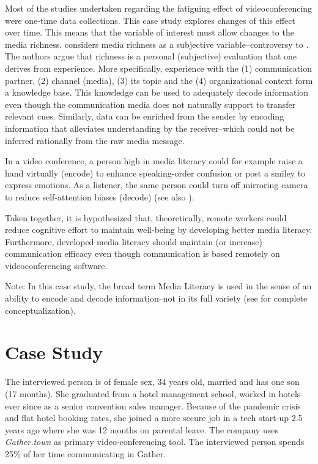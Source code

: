 \documentclass[man]{apa7}
\begin{document}
Most of the studies undertaken regarding the fatiguing effect of videoconferencing were one-time data collections. This case study explores changes of this effect over time. This means that the variable of interest must allow changes to the media richness. \cite{Carlson1999} considers media richness as a subjective variable–controversy to \citeauthor{daft1983information}. The authors argue that richness is a personal (subjective) evaluation that one derives from experience. More specifically, experience with the (1) communication partner, (2) channel (media), (3) its topic and the (4) organizational context form a knowledge base. This knowledge can be used to adequately decode information even though the communication media does not naturally support to transfer relevant cues. Similarly, data can be enriched from the sender by encoding information that alleviates understanding by the receiver–which could not be inferred rationally from the raw media message.

In a video conference, a person high in media literacy could for example raise a hand virtually (encode) to enhance speaking-order confusion or post a smiley to express emotions. As a listener, the same person could turn off mirroring camera to reduce self-attention biases (decode) (see also \cite{Riedl2021}).

Taken together, it is hypothesized that, theoretically, remote workers could reduce cognitive effort to maintain well-being by developing better media literacy. Furthermore, developed media literacy should maintain (or increase) communication efficacy even though communication is based remotely on videoconferencing software.

Note: In this case study, the broad term Media Literacy is used in the sense of an ability to encode and decode information–not in its full variety (see \cite{Potter2010} for complete conceptualization).


\section{Case Study}

The interviewed person is of female sex, 34 years old, married and has one son (17 months). She graduated from a hotel management school, worked in hotels ever since as a senior convention sales manager. Because of the pandemic crisis and flat hotel booking rates, she joined a more secure job in a tech start-up 2.5 years ago where she was 12 months on parental leave. The company uses \textit{Gather.town} as primary video-conferencing tool. The interviewed person spends 25\% of her time communicating in Gather.
\end{document}
